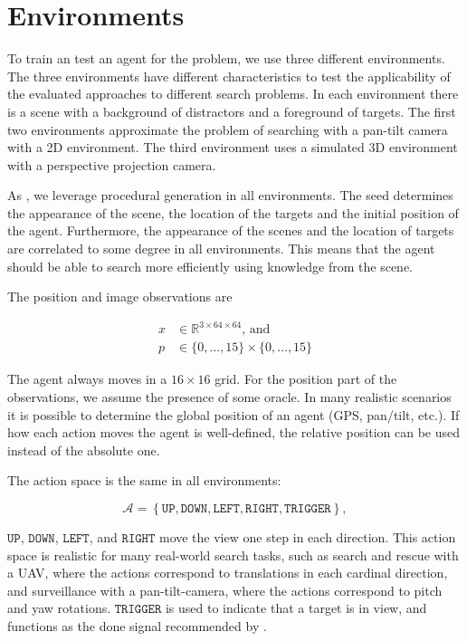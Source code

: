 \section{Environments}
\label{sec:environments}

To train an test an agent for the problem, we use three different environments.
The three environments have different characteristics to test the applicability of the evaluated approaches to different search problems.
In each environment there is a scene with a background of distractors and a foreground of targets.
The first two environments approximate the problem of searching with a pan-tilt camera with a 2D environment.
The third environment uses a simulated 3D environment with a perspective projection camera. 

As \cite{cobbe_procgen_2020,mnih_asynchronous_2016}, we leverage procedural generation in all environments.
The seed determines the appearance of the scene, the location of the targets and the initial position of the agent.
Furthermore, the appearance of the scenes and the location of targets are correlated to some degree in all environments.
This means that the agent should be able to search more efficiently using knowledge from the scene.

The position and image observations are

\begin{align*}
    x & \in \mathbb{R}^{3 \times 64 \times 64} \text{, and} \\
    p & \in \{0, \dots, 15\} \times \{0, \dots, 15\}
\end{align*}

The agent always moves in a \(16 \times 16\) grid.
For the position part of the observations, we assume the presence of some oracle.
In many realistic scenarios it is possible to determine the global position of an agent (GPS, pan/tilt, etc.).
If how each action moves the agent is well-defined, the relative position can be used instead of the absolute one.

The action space is the same in all environments:

\begin{equation*}
    \mathcal{A} = \left\lbrace \mathtt{UP}, \mathtt{DOWN}, \mathtt{LEFT}, \mathtt{RIGHT}, \mathtt{TRIGGER} \right\rbrace,
\end{equation*}

\(\mathtt{UP}\), \(\mathtt{DOWN}\), \(\mathtt{LEFT}\), and \(\mathtt{RIGHT}\) move the view one step in each direction.
This action space is realistic for many real-world search tasks,
such as search and rescue with a UAV, where the actions correspond to translations in each cardinal direction,
and surveillance with a pan-tilt-camera, where the actions correspond to pitch and yaw rotations.
\(\mathtt{TRIGGER}\) is used to indicate that a target is in view, and functions as the done signal recommended by \cite{anderson_evaluation_2018}.

